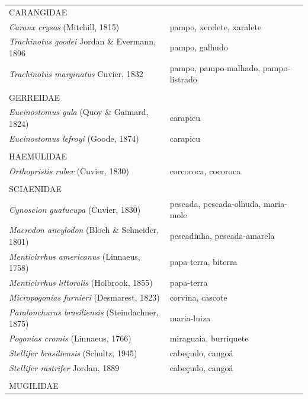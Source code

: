\documentclass[a4paper,11pt,twoside,showtrims,onecolumn,openright,final]{memoir}
\begin{document}

\begin{table}
\begin{center}
\begin{small}
\begin{tabular*}{\textwidth}{l@{\extracolsep{\fill}}p{}}
\toprule
CARANGIDAE					& \\
\emph{Caranx crysos} (Mitchill, 1815)			& pampo, xerelete, xaralete \\
\emph{Trachinotus goodei} Jordan \& Evermann, 1896	& pampo, galhudo \\
\emph{Trachinotus marginatus} Cuvier, 1832		& pampo, pampo-malhado, pampo-listrado \\
						& \\
GERREIDAE					& \\
\emph{Eucinostomus gula} (Quoy \& Gaimard, 1824)	& carapicu \\
\emph{Eucinostomus lefroyi} (Goode, 1874)		& carapicu \\
						& \\
HAEMULIDAE					& \\
\emph{Orthopristis ruber} (Cuvier, 1830)		& corcoroca, cocoroca \\
						& \\
SCIAENIDAE					& \\
\emph{Cynoscion guatucupa} (Cuvier, 1830)		& pescada, pescada-olhuda, maria-mole \\
\emph{Macrodon ancylodon} (Bloch \& Schneider, 1801)	& pescadinha, pescada-amarela \\
\emph{Menticirrhus americanus} (Linnaeus, 1758)	& papa-terra, biterra \\
\emph{Menticirrhus littoralis} (Holbrook, 1855)	& papa-terra \\
\emph{Micropogonias furnieri} (Desmarest, 1823)	& corvina, cascote \\
\emph{Paralonchurus brasiliensis} (Steindachner, 1875)	& maria-luiza \\
\emph{Pogonias cromis} (Linnaeus, 1766)		& miraguaia, burriquete \\
\emph{Stellifer brasiliensis} (Schultz, 1945)		& cabeçudo, cangoá \\
\emph{Stellifer rastrifer} Jordan, 1889		& cabeçudo, cangoá \\
						& \\
MUGILIDAE					& \\

\end{tabular*}
\end{small}
\end{center}
\end{table}
\end{document}
